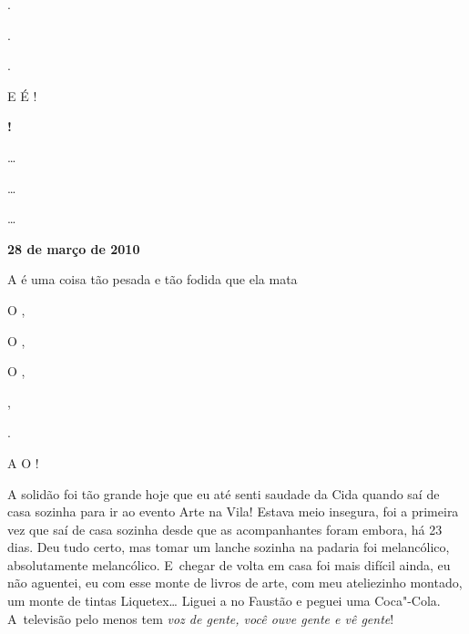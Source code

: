  .

 .

 .

E  É  !

    \textbf{!}

 …

 …

 …

\begin{center}\textbf{\asterisc{}}\end{center}


\begin{flushright}\textbf{}\end{flushright}
 \begin{flushright}\textbf{28 de março de 2010}\end{flushright}



A  é uma coisa tão pesada e tão fodida que ela mata

O   ,

O   ,

O   ,

     ,

    .

A    O      !

A solidão foi tão grande hoje que eu até senti saudade da Cida quando
saí de casa sozinha para ir ao evento Arte na Vila! Estava meio
insegura, foi a primeira vez que saí de casa sozinha desde que as
acompanhantes foram embora, há 23 dias. Deu tudo certo, mas tomar um
lanche sozinha na padaria foi melancólico, absolutamente melancólico. E~chegar de volta em casa foi mais difícil ainda, eu não aguentei, eu com
esse monte de livros de arte, com meu ateliezinho montado, um monte de
tintas Liquetex… Liguei a  no Faustão e peguei uma Coca"-Cola. A~televisão pelo menos tem \emph{voz de gente, você ouve gente e vê
gente}!

